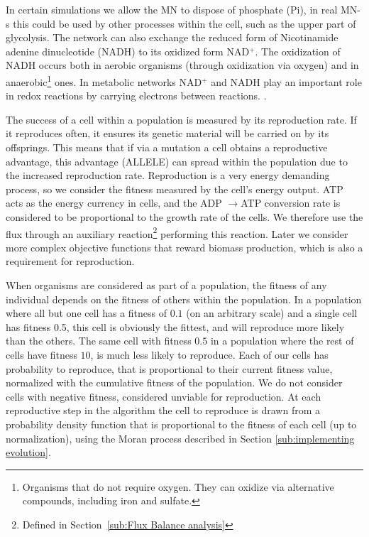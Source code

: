 \documentclass[a4paper,12pt]{article}
\begin{document}
	In certain simulations we allow the MN to dispose of phosphate (Pi), in real MN-s this could be used by other processes within the cell, such as the upper part of glycolysis. The network can also exchange the reduced form of Nicotinamide adenine dinucleotide (NADH) to its oxidized form NAD$^+$. The oxidization of NADH occurs both in aerobic organisms (through oxidization via oxygen) and in anaerobic\footnote{ Organisms that do not require oxygen. They can oxidize via alternative compounds, including iron and sulfate.} ones. In metabolic networks NAD$^+$ and NADH play an important role in redox reactions by carrying electrons between reactions. \cite{principlesofbio}.

	The success of a cell within a population is measured by its reproduction rate. If it reproduces often, it ensures its genetic material will be carried on by its offsprings. This means that if via a mutation a cell obtains a reproductive advantage, this advantage (ALLELE)  can spread within the population due to the increased reproduction rate. Reproduction is a very energy demanding process, so we consider the fitness  measured by the cell's energy output. ATP acts as the energy currency in cells, and the ADP $\rightarrow$ATP conversion rate is considered to be proportional to the growth rate of the cells. We therefore use the flux through an auxiliary reaction\footnote{Defined in Section~\ref{sub:Flux Balance analysis}} performing this reaction.  Later we consider more complex objective functions that reward biomass production, which is also a requirement for reproduction. 

	When organisms are considered as part of a population, the fitness of any individual depends on the fitness of others within the population. In a population where all but one cell has a fitness of $0.1$ (on an arbitrary scale) and a single cell has fitness 0.5, this cell is obviously the fittest, and will reproduce more likely than the others. The same cell with fitness $0.5$ in a population where the rest of cells have fitness $10$, is much less likely to reproduce. Each of our cells has probability to reproduce, that is proportional to their current fitness value, normalized with the cumulative fitness of the population. We do not consider cells with negative fitness, considered unviable for reproduction. At each reproductive step in the algorithm the cell to reproduce is drawn from a probability density function that is proportional to the fitness of each cell (up to normalization), using the Moran process described in Section \ref{sub:implementing evolution}.
\end{document}
